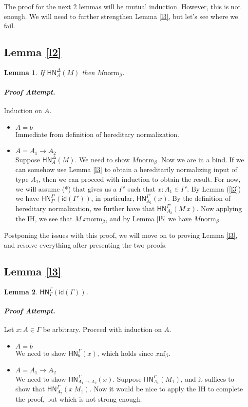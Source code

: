 \documentclass{article}
\newtheorem*{lemm}{Lemma}
\newenvironment{proofattempt}{\paragraph{\emph{Proof Attempt}.}}{\hfill\color{red}{X}\par}
\newcommand{\bnf}[1]{#1 \mathrel{\text{nf}_\beta}}
\newcommand{\bnorm}[1]{#1 \mathrel{\text{norm}_\beta}}
\newcommand{\hnorm}[3]{\ensuremath{\mathsf{HN}^{#1}_{#2}(#3)}}
\newcommand{\id}[1]{\ensuremath{\mathsf{id}(#1)}}
\newcommand{\fn}[2]{\ensuremath{#1 \to #2}}
\newcommand{\ap}[2]{\ensuremath{#1\ #2}}
\begin{document}
The proof for the next 2 lemmas will be mutual induction. However, this is not enough. We will need to further
strengthen Lemma \ref{l3}, but let's see where we fail.

\subsection{Lemma \ref{l2}}

\begin{lemm}
If $\hnorm{\Delta}{A}{M}$ then $\bnorm{M}$.
\end{lemm}

\begin{proofattempt}
Induction on $A$.
\begin{itemize}
  \setlength\itemsep{1em}
  \item $A = b$\\
  Immediate from definition of hereditary normalization.
  \item $A = \fn{A_1}{A_2}$\\
  Suppose $\hnorm{\Delta}{A}{M}$. We need to show $\bnorm{M}$. Now we are in a bind. If we can somehow use 
  Lemma \ref{l3} to obtain a hereditarily normalizing input of type $A_1$, then we can proceed with induction 
  to obtain the result. For now, we will assume (*) that gives us a $\Gamma'$ such that $x : A_1 \in \Gamma'$.
  By Lemma (\ref{l3}) we have $\hnorm{\Gamma'}{\Gamma'}{\id{\Gamma'}}$, in particular, $\hnorm{\Gamma'}{A_1}{x}$. By 
  the definition of hereditary normalization, we further have that $\hnorm{\Gamma'}{A_2}{\ap{M}{x}}$. Now applying the 
  IH, we see that $\bnorm{\ap{M}{x}}$, and by Lemma \ref{l5} we have $\bnorm{M}$. 
  \qedhere
\end{itemize}
\end{proofattempt}

Postponing the issues with this proof, we will move on to proving Lemma \ref{l3}, and resolve everything after
presenting the two proofs.

\subsection{Lemma \ref{l3}}

\begin{lemm}
$\hnorm{\Gamma}{\Gamma}{\id{\Gamma}}$.
\end{lemm}

\begin{proofattempt}
Let $x : A \in \Gamma$ be arbitrary. Proceed with induction on $A$.
\begin{itemize}
  \setlength\itemsep{1em}
  \item $A = b$\\
  We need to show $\hnorm{\Gamma}{b}{x}$, which holds since $\bnf{x}$.
  \item $A = \fn{A_1}{A_2}$\\
  We need to show $\hnorm{\Gamma}{\fn{A_1}{A_2}}{x}$. Suppose $\hnorm{\Gamma}{A_1}{M_1}$, and it suffices to show
  that $\hnorm{\Gamma}{A_2}{\ap{x}{M_1}}$. Now it would be nice to apply the IH to complete the proof, but which
  is not strong enough.
\end{itemize}
\end{proofattempt}
\end{document}
